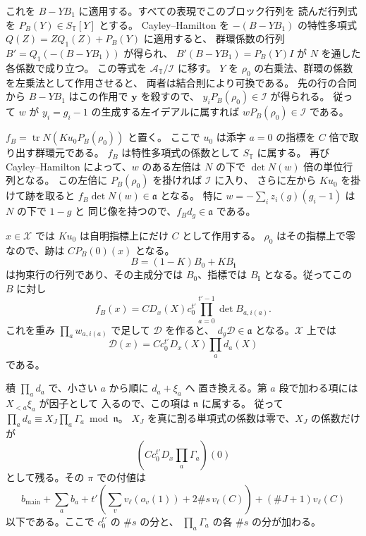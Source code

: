 これを \(B-YB_1\) に適用する。すべての表現でこのブロック行列を
読んだ行列式を \(P_B(Y)\in S_{\mathbb T}[Y]\) とする。
Cayley--Hamilton を \(-(B-YB_1)\) の特性多項式
\(Q(Z)=ZQ_1(Z)+P_B(Y)\) に適用すると、
群環係数の行列 \(B'=Q_1(-(B-YB_1))\) が得られ、
\(B'(B-YB_1)=P_B(Y)I\) が \(N\) を通した各係数で成り立つ。
この等式を \(\mathcal A_{\mathbb T}/\mathscr I\) に移す。
\(Y\) を \(\rho_0\) の右乗法、群環の係数を左乗法として作用させると、
両者は結合則により可換である。
先の行の合同から \(B-YB_1\) はこの作用で \(\mathbf y\) を殺すので、
\(y_iP_B(\rho_0)\in\mathscr I\) が得られる。
従って \(w\) が \(y_i=g_i-1\) の生成する左イデアルに属すれば
\(wP_B(\rho_0)\in\mathscr I\) である。

\(f_B=\operatorname{tr}N(Ku_0P_B(\rho_0))\) と置く。
ここで \(u_0\) は添字 \(a=0\) の指標を \(C\) 倍で取り出す群環元である。
\(f_B\) は特性多項式の係数として \(S_{\mathbb T}\) に属する。
再び Cayley--Hamilton によって、\(w\) のある左倍は \(N\) の下で
\(\det N(w)\) 倍の単位行列となる。
この左倍に \(P_B(\rho_0)\) を掛ければ \(\mathscr I\) に入り、
さらに左から \(Ku_0\) を掛けて跡を取ると
\(f_B\det N(w)\in\mathfrak a\) となる。
特に \(w=-\sum_i z_i(g)(g_i-1)\) は \(N\) の下で \(1-g\) と
同じ像を持つので、\(f_B d_g\in\mathfrak a\) である。

\(x\in\mathcal X\) では \(Ku_0\) は自明指標上にだけ \(C\) として作用する。
\(\rho_0\) はその指標上で零なので、跡は \(C P_B(0)(x)\) となる。
\[
 B=(1-K)B_0+KB_{\mathbf i}
\]
は拘束行の行列であり、その主成分では \(B_0\)、指標では
\(B_{\mathbf i}\) となる。従ってこの \(B\) に対し
\[
 f_B(x)= C D_x(X)c_0^{t'}
                  \prod_{a=0}^{t'-1}\det B_{a,i(a)}.
\]
これを重み \(\prod_a w_{a,i(a)}\) で足して \(\mathcal D\) を作ると、
\(d_g\mathcal D\in\mathfrak a\) となる。\(\mathcal X\) 上では
\[
 \mathcal D(x)=C c_0^{t'}D_x(X)\prod_a d_a(X)
\]
である。

積 \(\prod_a d_a\) で、小さい \(a\) から順に \(d_a+\xi_a\) へ
置き換える。第 \(a\) 段で加わる項には \(X_{<a}\xi_a\) が因子として
入るので、この項は \(\mathfrak n\) に属する。
従って \(\prod_a d_a\equiv X_J\prod_a\Gamma_a\bmod\mathfrak n\)。
\(X_J\) を真に割る単項式の係数は零で、\(X_J\) の係数だけが
\[
 (C c_0^{t'}D_x\prod_a\Gamma_a)(0)
\]
として残る。その \(\pi\) での付値は
\[
 b_{\mathrm{main}}+\sum_a b_a+
 t'\!\left(\sum_v v_\ell(o_v(1))+2\#s\,v_\ell(C)\right)
       +(\#J+1)v_\ell(C)
\]
以下である。ここで \(c_0^{t'}\) の \(\#s\) の分と、
\(\prod_a\Gamma_a\) の各 \(\#s\) の分が加わる。
